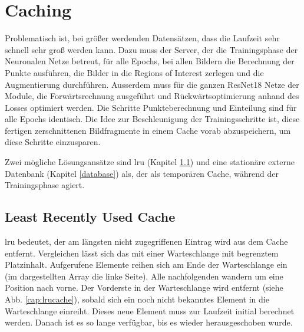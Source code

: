 \clearpage
\section{Caching}\label{caching}
Problematisch ist, bei größer werdenden Datensätzen, dass die Laufzeit sehr schnell sehr groß werden kann. Dazu muss der Server, der die Trainingsphase der Neuronalen Netze betreut, für alle Epochs, bei allen Bildern die Berechnung der Punkte ausführen, die Bilder in die Regions of Interest zerlegen und die Augmentierung durchführen. Ausserdem muss für die ganzen ResNet18 Netze der Module, die Forwärtsrechnung ausgeführt und Rückwärtsoptimierung anhand des Losses optimiert werden. Die Schritte Punkteberechnung und Einteilung sind für alle Epochs identisch. Die Idee zur Beschleunigung der Trainingsschritte ist, diese fertigen zerschnittenen Bildfragmente in einem Cache vorab abzuspeichern, um diese Schritte einzusparen.

Zwei mögliche Lösungsansätze sind \ac{lru} (Kapitel \ref{lrucache}) und eine stationäre externe Datenbank (Kapitel \ref{database}) als, der als temporären Cache, während der Trainingsphase agiert.

\subsection{Least Recently Used Cache}\label{lrucache}
\ac{lru} bedeutet, der am längsten nicht zugegriffenen Eintrag wird aus dem Cache entfernt. Vergleichen lässt sich das mit einer Warteschlange mit begrenztem Platzinhalt. Aufgerufene Elemente reihen sich am Ende der Warteschlange ein (im dargestellten Array die linke Seite). Alle nachfolgenden wandern um eine Position nach vorne. Der Vorderste in der Warteschlange wird entfernt (siehe Abb. \ref{cap:lrucache}), sobald sich ein noch nicht bekanntes Element in die Warteschlange einreiht. Dieses neue Element muss zur Laufzeit initial berechnet werden. Danach ist es so lange verfügbar, bis es wieder herausgeschoben wurde.

